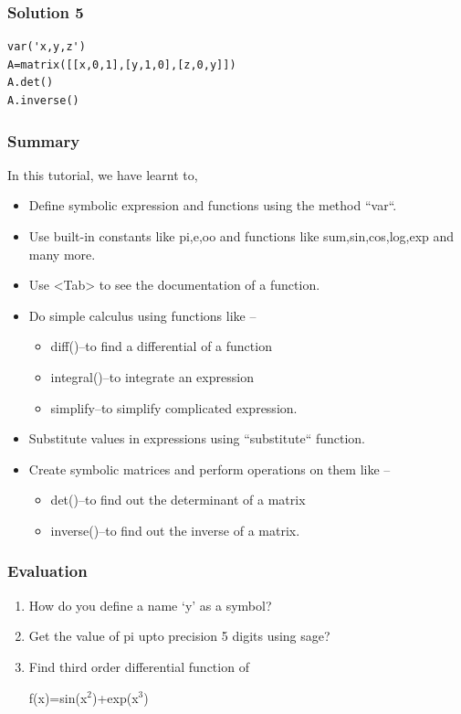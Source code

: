 \documentclass[presentation]{beamer}
\begin{document}
\begin{frame}[fragile]
\frametitle{Solution 5}
\label{sec-13}

\lstset{language=Python}
\begin{lstlisting}
var('x,y,z')
A=matrix([[x,0,1],[y,1,0],[z,0,y]])
A.det()
A.inverse()
\end{lstlisting}
\end{frame}
\begin{frame}
\frametitle{Summary}
\label{sec-14}

In this tutorial, we have learnt to,


\begin{itemize}
\item Define symbolic expression and functions using the method ``var``.
\item Use built-in constants like pi,e,oo and functions like 
   sum,sin,cos,log,exp and many more.
\item Use <Tab> to see the documentation of a function.
\item Do simple calculus using functions like --
\begin{itemize}
\item diff()--to find a differential of a function
\item integral()--to integrate an expression
\item simplify--to simplify complicated expression.
\end{itemize}
\item Substitute values in expressions using ``substitute`` function.
\item Create symbolic matrices and perform operations on them like --
\begin{itemize}
\item det()--to find out the determinant of a matrix
\item inverse()--to find out the inverse of a matrix.
\end{itemize}
\end{itemize}
\end{frame}
\begin{frame}
\frametitle{Evaluation}
\label{sec-15}


\begin{enumerate}
\item How do you define a name `y' as a symbol?
\vspace{8pt}
\item Get the value of pi upto precision 5 digits using sage?
\vspace{8pt}
\item Find third order differential function of

   f(x)=sin(x$^2$)+exp(x$^3$)
\end{enumerate}
\end{frame}
\end{document}
